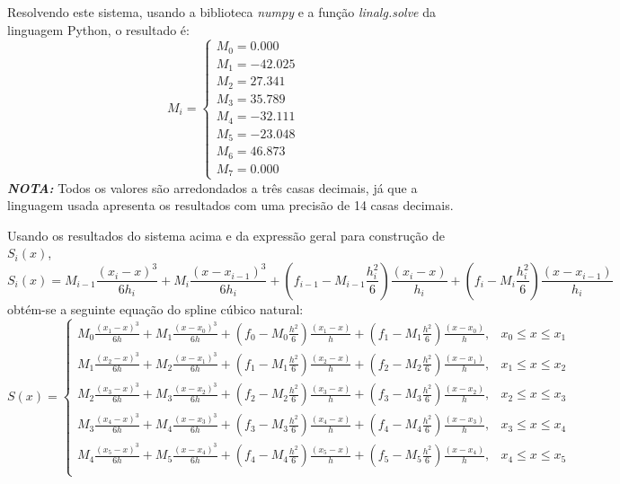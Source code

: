 \documentclass[12pt, letterpaper,fleqn]{article}
\begin{document}
\begin{itemize}
    Resolvendo este sistema, usando a biblioteca \textit{numpy} e a função \textit{linalg.solve} da linguagem Python, o resultado é:
    $$
        M_i =\begin{cases}
            M_0 = 0.000   \\
            M_1 = -42.025 \\
            M_2 = 27.341  \\
            M_3 = 35.789  \\
            M_4 = -32.111 \\
            M_5 = -23.048 \\
            M_6 = 46.873  \\
            M_7 = 0.000       
        \end{cases}
    $$
    \textbf{\textit{NOTA:}} Todos os valores são arredondados a três casas decimais, já que a linguagem usada apresenta os resultados com uma precisão de 14 casas decimais.
    
    Usando os resultados do sistema acima e da expressão geral para construção de $S_i(x)$,
    $$
        S_i(x) = M_{i-1}\frac{(x_i - x)^3}{6h_i} + M_i\frac{(x-x_{i-1})^3}{6h_i}+(f_{i-1} - M_{i-1} \frac{h_i^2}{6})\frac{(x_i - x)}{h_i} + (f_i - M_i\frac{h_i^2}{6})\frac{(x-x_{i-1})}{h_i}
    $$
    obtém-se a seguinte equação do spline cúbico natural:
    \begin{equation}
        S(x) = \begin{cases}
            M_0\frac{(x_1 - x)^3}{6h} + M_1\frac{(x-x_0)^3}{6h}+(f_0 - M_0\frac{h^2}{6})\frac{(x_1 - x)}{h} + (f_1 - M_1\frac{h^2}{6}) \frac{(x-x_0)}{h}, & x_0 \leq x \leq x_1 \\
            
            M_1\frac{(x_2 - x)^3}{6h} + M_2\frac{(x-x_1)^3}{6h}+(f_1 - M_1\frac{h^2}{6})\frac{(x_2 - x)}{h} + (f_2 - M_2\frac{h^2}{6}) \frac{(x-x_1)}{h}, & x_1 \leq x \leq x_2 \\
            
            M_2\frac{(x_3 - x)^3}{6h} + M_3\frac{(x-x_2)^3}{6h}+(f_2 - M_2\frac{h^2}{6})\frac{(x_3 - x)}{h} + (f_3 - M_3\frac{h^2}{6}) \frac{(x-x_2)}{h}, & x_2 \leq x \leq x_3 \\
            
            M_3\frac{(x_4 - x)^3}{6h} + M_4\frac{(x-x_3)^3}{6h}+(f_3 - M_3\frac{h^2}{6})\frac{(x_4 - x)}{h} + (f_4 - M_4\frac{h^2}{6}) \frac{(x-x_3)}{h}, & x_3 \leq x \leq x_4 \\

            M_4\frac{(x_5 - x)^3}{6h} + M_5\frac{(x-x_4)^3}{6h}+(f_4 - M_4\frac{h^2}{6})\frac{(x_5 - x)}{h} + (f_5 - M_5\frac{h^2}{6}) \frac{(x-x_4)}{h}, & x_4 \leq x \leq x_5 \\
            

\end{cases}
\end{equation}
\end{itemize}
\end{document}
